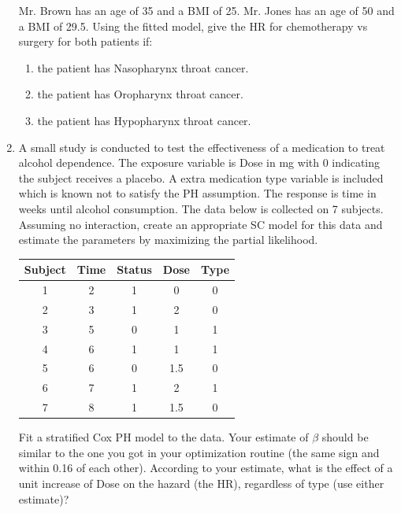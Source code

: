 \documentclass[12pt]{article}
\begin{document}
\begin{enumerate}[1.]
\begin{center}
\end{center}
Mr. Brown has an age of 35 and a BMI of 25. Mr. Jones has an age of 50 and a BMI of 29.5. Using the fitted model, give the HR for chemotherapy vs surgery for both patients if:
\begin{enumerate}
\item  the patient has Nasopharynx throat cancer.
\item  the patient has Oropharynx throat cancer.
\item  the patient has Hypopharynx throat cancer.
\end{enumerate}
\item A small study is conducted to test the effectiveness of a medication to treat alcohol dependence. The exposure variable is Dose in mg with 0 indicating the subject receives a placebo.  A extra medication type variable is included which is known not to satisfy the PH assumption.  The response is time in weeks until alcohol consumption. The data below is collected on 7 subjects. Assuming no interaction, create an appropriate SC model for this data and estimate the parameters by maximizing the partial likelihood.
\begin{center}
\begin{tabular}{ c c c c c} \hline
Subject & Time & Status & Dose & Type \\ \hline
1 & 2 & 1 &  0 & 0\\
 2 & 3 & 1 &  2 & 0\\
3 & 5 & 0  & 1 & 1\\
4  & 6 & 1  & 1 & 1\\
5  & 6 & 0  & 1.5 & 0 \\
6  & 7 & 1  & 2 & 1 \\
7  & 8 & 1  & 1.5 & 0 \\
\end{tabular}
\end{center}
Fit a stratified Cox PH model to the data. Your estimate of $\beta$ should be similar to the one you got in your optimization routine (the same sign and within 0.16 of each other).
According to your estimate, what is the effect of a unit increase of Dose on the hazard (the HR), regardless of type (use either estimate)?
\end{enumerate}
\end{document}
